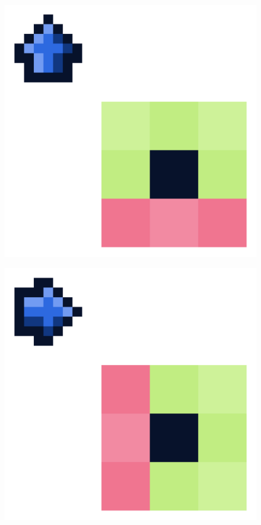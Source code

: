 \documentclass[oneside]{lmdEN}%
\begin{document}
\begin{figure}[ht]
\centering
\begin{minipage}{.5\textwidth}
  \centering
  \includegraphics[width=.8\linewidth]{images/unit-rotation-n.png}
  \label{fig:unit-rotation-n}
\end{minipage}%
\begin{minipage}{.5\textwidth}
  \centering
  \includegraphics[width=.8\linewidth]{images/unit-rotation-e.png}
  \label{fig:unit-rotation-e}
\end{minipage}

\end{figure}
\end{document}

